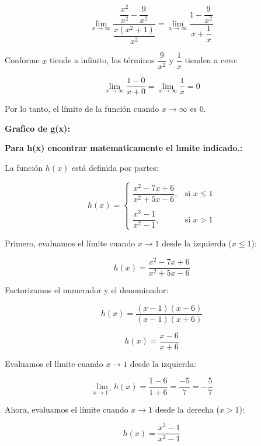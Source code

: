 \documentclass[answers]{exam} %
\begin{document}
\begin{questions}
\begin{solution}
        \[
        \lim_{{x \to \infty}} \dfrac{\dfrac{x^2}{x^2} - \dfrac{9}{x^2}}{\dfrac{x(x^2 + 1)}{x^2}} = \lim_{{x \to \infty}} \dfrac{1 - \dfrac{9}{x^2}}{x + \dfrac{1}{x}}
        \]
    
        Conforme \( x \) tiende a infinito, los términos $\displaystyle \dfrac{9}{x^2}$ y $\displaystyle \dfrac{1}{x}$ tienden a cero:
    
        \[
        \lim_{{x \to \infty}} \dfrac{1 - 0}{x + 0} = \lim_{{x \to \infty}} \dfrac{1}{x} = 0
        \]
    
        Por lo tanto, el límite de la función cuando \( x \rightarrow \infty \) es \( 0 \).
        \end{solution}
    
	\large\textbf{Grafico de g(x):}
    \begin{solution}
	\end{solution}
	\large\textbf{Para h(x) encontrar matematicamente el lımite indicado.:}
    \begin{solution}
        La función \( h(x) \) está definida por partes:
    
        \[
        h(x) =
        \begin{cases}
            \dfrac{x^2 - 7x + 6}{x^2 + 5x - 6}, & \text{si } x \leq 1 \\
            \\
            \dfrac{x^3 - 1}{x^2 - 1}, & \text{si } x > 1
        \end{cases}
        \]
    
        Primero, evaluamos el límite cuando \( x \rightarrow 1 \) desde la izquierda (\( x \leq 1 \)):
    
        \[
        h(x) = \frac{x^2 - 7x + 6}{x^2 + 5x - 6}
        \]
    
        Factorizamos el numerador y el denominador:
    
        \[
        h(x) = \frac{(x - 1)(x - 6)}{(x - 1)(x + 6)}
        \]
    
    
        \[
        h(x) = \frac{x - 6}{x + 6}
        \]
    
        Evaluamos el límite cuando \( x \rightarrow 1 \) desde la izquierda:
    
        \[
        \lim_{{x \to 1^-}} h(x) = \frac{1 - 6}{1 + 6} = \frac{-5}{7} = -\frac{5}{7}
        \]
    
        Ahora, evaluamos el límite cuando \( x \rightarrow 1 \) desde la derecha (\( x > 1 \)):
    
        \[
        h(x) = \frac{x^3 - 1}{x^2 - 1}
        \]
    

\end{solution}
\end{questions}
\end{document}
